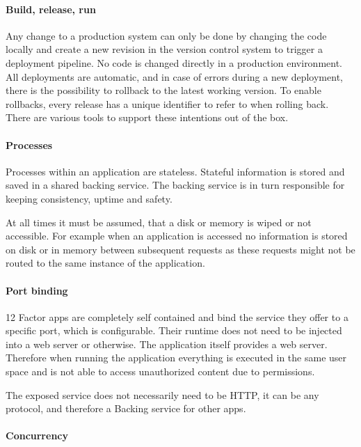 \paragraph{Build, release, run}

Any change to a production system can only be done by changing the code locally
and create a new revision in the version control system to trigger a deployment
pipeline. No code is changed directly in a production environment. All
deployments are automatic, and in case of errors during a new deployment, there
is the possibility to rollback to the latest working version. To enable
rollbacks, every release has a unique identifier to refer to when rolling back.
There are various tools to support these intentions out of the box.

\paragraph{Processes}

Processes within an application are stateless. Stateful information is stored
and saved in a shared backing service. The backing service is in turn
responsible for keeping consistency, uptime and safety.

At all times it must be assumed, that a disk or memory is wiped or not
accessible. For example when an application is accessed no information is
stored on disk or in memory between subsequent requests as these requests might
not be routed to the same instance of the application.

\paragraph{Port binding}

12 Factor apps are completely self contained and bind the service they offer to
a specific port, which is configurable. Their runtime does not need to be
injected into a web server or otherwise. The application itself provides a
web server.  Therefore when running the application everything is executed in
the same user space and is not able to access unauthorized content due to
permissions.

The exposed service does not necessarily need to be HTTP, it can be any
protocol, and therefore a Backing service for other apps.

\paragraph{Concurrency}

